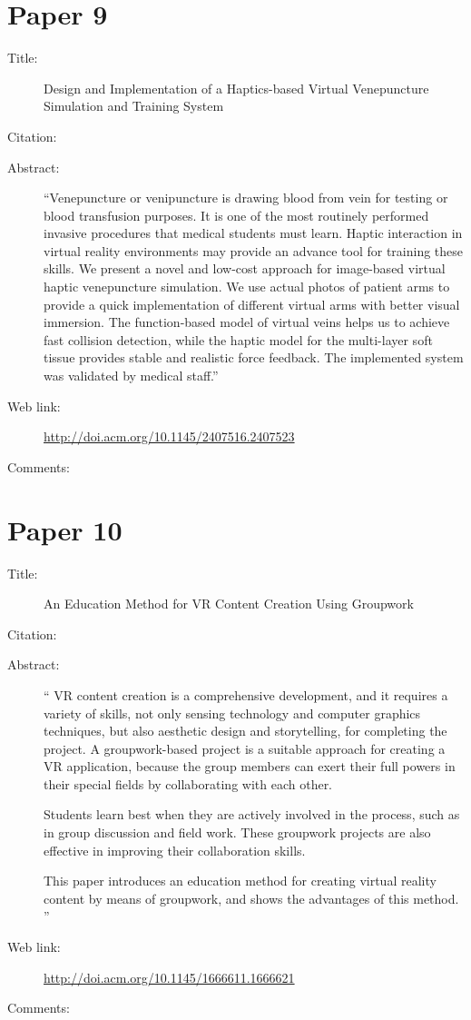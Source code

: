 \documentclass{scrartcl}
\begin{document}
	\section*{Paper 9}
	\begin{description}
		\item[Title:] Design and Implementation of a Haptics-based Virtual Venepuncture Simulation and Training System
		\item[Citation:] \cite{Xia}
		\item[Abstract:] ``Venepuncture or venipuncture is drawing blood from vein for testing or blood transfusion purposes. It is one of the most routinely performed invasive procedures that medical students must learn. Haptic interaction in virtual reality environments may provide an advance tool for training these skills. We present a novel and low-cost approach for image-based virtual haptic venepuncture simulation. We use actual photos of patient arms to provide a quick implementation of different virtual arms with better visual immersion. The function-based model of virtual veins helps us to achieve fast collision detection, while the haptic model for the multi-layer soft tissue provides stable and realistic force feedback. The implemented system was validated by medical staff.''
		\item[Web link:] \url{http://doi.acm.org/10.1145/2407516.2407523}
		\item[Comments:]
	\end{description}
	
	\section*{Paper 10}
	\begin{description}
		\item[Title:] An Education Method for VR Content Creation Using Groupwork
		\item[Citation:] \cite{Miyata}
		\item[Abstract:] ``
		VR content creation is a comprehensive development, and it requires a variety of skills, not only sensing technology and computer graphics techniques, but also aesthetic design and storytelling, for completing the project. A groupwork-based project is a suitable approach for creating a VR application, because the group members can exert their full powers in their special fields by collaborating with each other.
		
		Students learn best when they are actively involved in the process, such as in group discussion and field work. These groupwork projects are also effective in improving their collaboration skills.
		
		This paper introduces an education method for creating virtual reality content by means of groupwork, and shows the advantages of this method.
		''
		\item[Web link:] \url{http://doi.acm.org/10.1145/1666611.1666621}
		\item[Comments:]
	\end{description}
	
\end{document}

